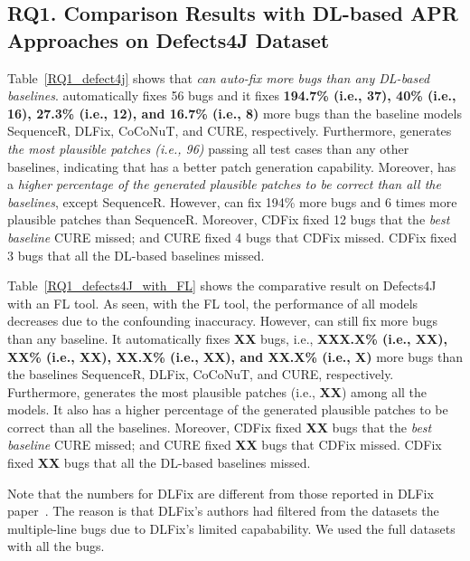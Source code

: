 \subsection{\bf RQ1. Comparison Results with DL-based APR Approaches on Defects4J Dataset}

Table~\ref{RQ1_defect4j} shows that {\em {\tool} can auto-fix more bugs
than any DL-based baselines}. {\tool}
automatically fixes 56 bugs and it fixes {\bf 194.7\% (i.e., 37), 40\%
(i.e., 16), 27.3\% (i.e., 12), and 16.7\% (i.e., 8)} more bugs than the
baseline models SequenceR, DLFix, CoCoNuT, and CURE,
respectively. Furthermore, {\tool} generates {\em the most plausible
patches (i.e., 96)} passing all test cases than any other baselines,
indicating that {\tool} has a better patch generation
capability. Moreover, {\tool} has a {\em higher percentage of the generated
plausible patches to be correct than all the baselines}, except
SequenceR. However, {\tool} can fix 194\% more bugs and 6 times more
plausible patches than SequenceR.
%
Moreover, CDFix fixed 12 bugs that the {\em best baseline} CURE
missed; and CURE fixed 4 bugs that CDFix missed. CDFix fixed 3 bugs
that all the DL-based baselines missed.

Table~\ref{RQ1_defects4J_with_FL} shows the comparative result on
Defects4J with an FL tool. As seen, with the FL tool, the performance
of all models decreases due to the confounding inaccuracy. However,
{\tool} can still fix more bugs than any baseline. It
automatically fixes {\bf XX} bugs, i.e., {\bf XXX.X\% (i.e., XX), XX\%
  (i.e., XX), XX.X\% (i.e., XX), and XX.X\% (i.e., X)} more bugs than
the baselines SequenceR, DLFix, CoCoNuT, and CURE,
respectively. Furthermore, {\tool} generates the most plausible
patches (i.e., {\bf XX}) among all the models.
It also has a higher percentage of the generated plausible patches to
be correct than all the baselines.
Moreover, CDFix fixed {\bf XX} bugs that the {\em best baseline} CURE
missed; and CURE fixed {\bf XX} bugs that CDFix missed. CDFix fixed
{\bf XX} bugs that all the DL-based baselines missed.

Note that the numbers for DLFix are different from those
reported in DLFix paper~\cite{icse20}. The reason is that DLFix's
authors had filtered from the datasets the multiple-line bugs due to
DLFix's limited capabability. We used the full datasets with all the
bugs.

